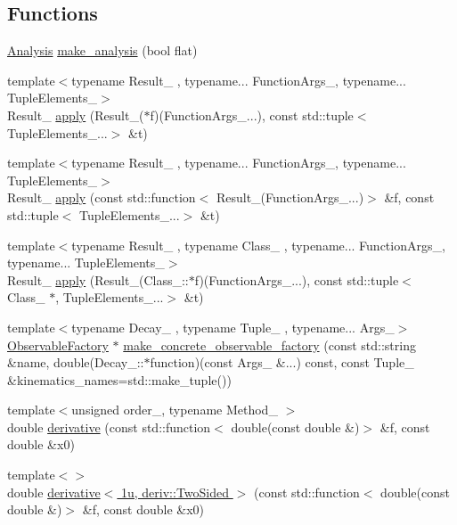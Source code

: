 \subsection*{Functions}
\begin{DoxyCompactItemize}
\item 
\hyperlink{classeos_1_1Analysis}{Analysis} \hyperlink{namespaceeos_ae42e0cf8b4c1c3548fc27a5add336258}{make\_\-analysis} (bool flat)
\item 
{\footnotesize template$<$typename Result\_\- , typename... FunctionArgs\_\-, typename... TupleElements\_\-$>$ }\\Result\_\- \hyperlink{namespaceeos_a6d6ca72f35614029a62c270ec042d80c}{apply} (Result\_\-($\ast$f)(FunctionArgs\_\-...), const std::tuple$<$ TupleElements\_\-...$>$ \&t)
\item 
{\footnotesize template$<$typename Result\_\- , typename... FunctionArgs\_\-, typename... TupleElements\_\-$>$ }\\Result\_\- \hyperlink{namespaceeos_a56ba31c6e8b9cd9a310e2df15220d202}{apply} (const std::function$<$ Result\_\-(FunctionArgs\_\-...)$>$ \&f, const std::tuple$<$ TupleElements\_\-...$>$ \&t)
\item 
{\footnotesize template$<$typename Result\_\- , typename Class\_\- , typename... FunctionArgs\_\-, typename... TupleElements\_\-$>$ }\\Result\_\- \hyperlink{namespaceeos_a05333558aad48dbab3da261c54e3282d}{apply} (Result\_\-(Class\_\-::$\ast$f)(FunctionArgs\_\-...), const std::tuple$<$ Class\_\- $\ast$, TupleElements\_\-...$>$ \&t)
\item 
{\footnotesize template$<$typename Decay\_\- , typename Tuple\_\- , typename... Args\_\-$>$ }\\\hyperlink{classeos_1_1ObservableFactory}{ObservableFactory} $\ast$ \hyperlink{namespaceeos_a70620ec1b39b5dbcd70937b6065665a0}{make\_\-concrete\_\-observable\_\-factory} (const std::string \&name, double(Decay\_\-::$\ast$function)(const Args\_\- \&...) const, const Tuple\_\- \&kinematics\_\-names=std::make\_\-tuple())
\item 
{\footnotesize template$<$unsigned order\_\-, typename Method\_\- $>$ }\\double \hyperlink{namespaceeos_af951dd2b07bb6381c7529bc0558a629a}{derivative} (const std::function$<$ double(const double \&)$>$ \&f, const double \&x0)
\item 
{\footnotesize template$<$$>$ }\\double \hyperlink{namespaceeos_ab2af1ce0d7308e92a859714806a6d4f0}{derivative$<$ 1u, deriv::TwoSided $>$} (const std::function$<$ double(const double \&)$>$ \&f, const double \&x0)

\end{DoxyCompactItemize}
